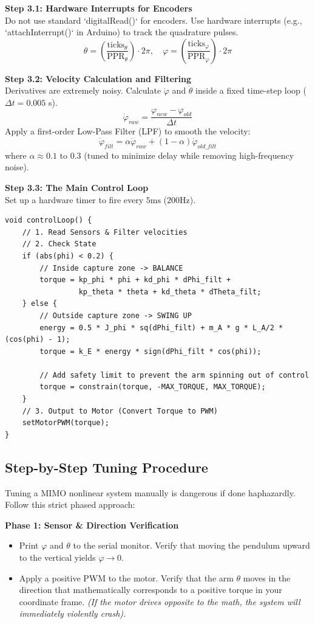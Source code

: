 \documentclass[12pt]{article}
\begin{document}
\textbf{Step 3.1: Hardware Interrupts for Encoders}\\
Do not use standard `digitalRead()` for encoders. Use hardware interrupts (e.g., `attachInterrupt()` in Arduino) to track the quadrature pulses. 
$$ \theta = \left( \frac{\text{ticks}_\theta}{\text{PPR}_\theta} \right) \cdot 2\pi, \quad \varphi = \left( \frac{\text{ticks}_\varphi}{\text{PPR}_\varphi} \right) \cdot 2\pi $$

\textbf{Step 3.2: Velocity Calculation and Filtering}\\
Derivatives are extremely noisy. Calculate $\dot{\varphi}$ and $\dot{\theta}$ inside a fixed time-step loop ($\Delta t = 0.005$ s).
$$ \dot{\varphi}_{raw} = \frac{\varphi_{new} - \varphi_{old}}{\Delta t} $$
Apply a first-order Low-Pass Filter (LPF) to smooth the velocity:
$$ \dot{\varphi}_{filt} = \alpha \dot{\varphi}_{raw} + (1 - \alpha)\dot{\varphi}_{old\_filt} $$
where $\alpha \approx 0.1$ to $0.3$ (tuned to minimize delay while removing high-frequency noise).

\textbf{Step 3.3: The Main Control Loop}\\
Set up a hardware timer to fire every $5\text{ms}$ ($200\text{Hz}$).
\begin{verbatim}
void controlLoop() {
    // 1. Read Sensors & Filter velocities
    // 2. Check State
    if (abs(phi) < 0.2) { 
        // Inside capture zone -> BALANCE
        torque = kp_phi * phi + kd_phi * dPhi_filt + 
                 kp_theta * theta + kd_theta * dTheta_filt;
    } else {
        // Outside capture zone -> SWING UP
        energy = 0.5 * J_phi * sq(dPhi_filt) + m_A * g * L_A/2 * (cos(phi) - 1);
        torque = k_E * energy * sign(dPhi_filt * cos(phi));
        
        // Add safety limit to prevent the arm spinning out of control
        torque = constrain(torque, -MAX_TORQUE, MAX_TORQUE);
    }
    // 3. Output to Motor (Convert Torque to PWM)
    setMotorPWM(torque);
}
\end{verbatim}

\subsection{Step-by-Step Tuning Procedure}

Tuning a MIMO nonlinear system manually is dangerous if done haphazardly. Follow this strict phased approach:

\textbf{Phase 1: Sensor \& Direction Verification}
\begin{itemize}
    \item Print $\varphi$ and $\theta$ to the serial monitor. Verify that moving the pendulum upward to the vertical yields $\varphi \to 0$.
    \item Apply a positive PWM to the motor. Verify that the arm $\theta$ moves in the direction that mathematically corresponds to a positive torque in your coordinate frame. \textit{(If the motor drives opposite to the math, the system will immediately violently crash).}
\end{itemize}
\end{document}
